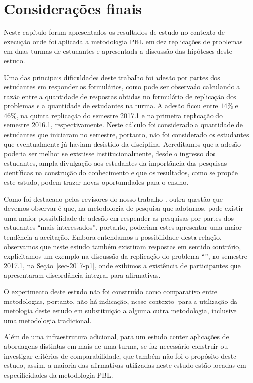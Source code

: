 \section{Considerações finais}
\label{sec-consideracoes-resultados}
Neste capítulo foram apresentados os resultados do estudo no contexto de execução onde foi aplicada a
metodologia \ac{PBL} em dez replicações de problemas em duas turmas de estudantes e apresentada a discussão
das hipóteses deste estudo.

Uma das principais dificuldades deste trabalho foi adesão
por partes dos estudantes em responder os formulários,
como pode ser observado calculando a razão entre
a quantidade de respostas obtidas no formulário de
replicação dos problemas e a quantidade de estudantes
na turma.
A adesão ficou entre $14\%$ e $46\%$, na
quinta replicação do semestre 2017.1 e na primeira
replicação do semestre 2016.1, respectivamente.
Neste cálculo foi considerado a quantidade de estudantes
que iniciaram no semestre, portanto, não foi considerado os
estudantes que eventualmente já haviam desistido
da disciplina.
Acreditamos que a adesão poderia ser melhor se existisse
institucionalmente, desde o ingresso dos estudantes,
ampla divulgação aos estudantes da importância das pesquisas
científicas na construção do conhecimento e que os resultados,
como se propõe este estudo, podem trazer novas oportunidades
para o ensino.

Como foi destacado pelos revisores do nosso trabalho ,
outra questão que devemos observar é que, na metodologia de pesquisa
que adotamos, pode existir uma maior possibilidade
de adesão em responder as pesquisas por partes
dos estudantes ``mais interessados'', portanto, poderiam
estes apresentar uma maior tendência a aceitação.
Embora entendamos a possibilidade desta relação, observamos que
neste estudo também existiram respostas em sentido
contrário, explicitamos um exemplo na discussão da
replicação do problema ``\ProblemaG'', no semestre 2017.1,
na Seção~\ref{sec-2017-p1}, onde exibimos a existência
de participantes que apresentaram discordância integral
para afirmativas.

O experimento deste estudo não foi construído como comparativo
entre metodologias, portanto, não há indicação, nesse
contexto, para a utilização da metologia deste estudo
em substituição a alguma outra metodologia, inclusive uma
metodologia tradicional.

Além de uma infraestrutura adicional, para um estudo conter
aplicações de abordagens distintas em mais de uma turma,
se faz necessário construir ou investigar critérios de
comparabilidade, que também não foi o propósito deste estudo,
assim, a maioria das afirmativas utilizadas neste estudo
estão focadas em especificidades da metodologia \ac{PBL}.


